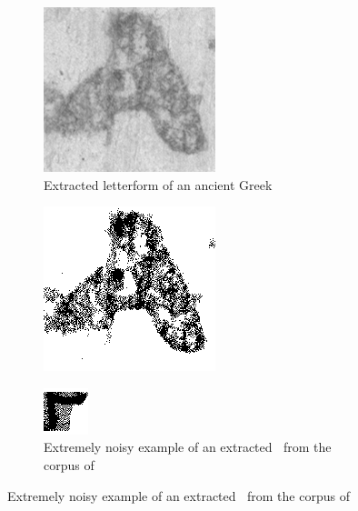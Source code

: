 \documentclass[10pt,twocolumn,letterpaper]{article}
\begin{document}
\begin{figure}
    \centering
    \begin{subfigure}{0.5\textwidth}
        \centering
        \includegraphics[width=0.4\linewidth]{res/198423984.png}
        \caption{Extracted letterform of an ancient Greek \textAlpha}
        \label{fig:regalpha}
    \end{subfigure}
    \begin{subfigure}{0.5\textwidth}
        \centering
        \includegraphics[width=0.4\linewidth]{res/001.png}
        \label{fig:binalpha}
    \end{subfigure}
    \begin{subfigure}{0.5\textwidth}
        \centering
        \includegraphics[width=0.4\linewidth]{res/002.png}
        \caption{Extremely noisy example of an extracted \textLambda$\:$ from the corpus of \cite{BYU}}
        \label{fig:noisyLambda}
    \end{subfigure}

\end{figure}
\end{document}
